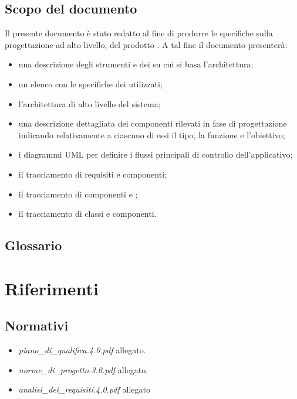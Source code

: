 \subsection{Scopo del documento}
Il presente documento è stato redatto al fine di produrre le specifiche sulla progettazione ad alto livello, del prodotto \caName. A tal fine il documento presenterà:
\begin{itemize}
    \item una descrizione degli strumenti e dei \underline{} su cui si basa l'architettura;
	\item un elenco con le specifiche dei  utilizzati;
	\item l'architettura di alto livello del sistema;
	\item una descrizione dettagliata dei componenti rilevati in fase di progettazione indicando relativamente a ciascuno di essi il tipo, la funzione e l'obiettivo;
	\item i diagrammi UML per definire i flussi principali di controllo dell'applicativo;
	\item il tracciamento di requisiti e componenti;
	\item il tracciamento di componenti e ;
	\item il tracciamento di classi e componenti.
\end{itemize}

\subsection{Glossario}
\glossaryIntro

\clearpage
\section{Riferimenti}

\subsection{Normativi}
\begin{itemize}
\item[] \textit{piano\_di\_qualifica.4.0.pdf} allegato.
\item[] \textit{norme\_di\_progetto.3.0.pdf} allegato.
\item[] \textit{analisi\_dei\_requisiti.4.0.pdf} allegato
\end{itemize}


